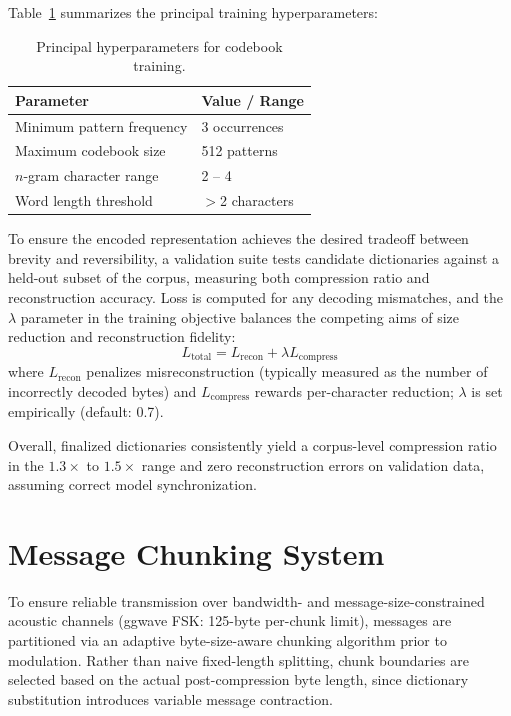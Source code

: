 \documentclass[12pt,openany]{article}
\theoremstyle{definition}
\theoremstyle{definition}
\theoremstyle{definition}
\begin{document}
Table~\ref{tab:training-hyperparameters} summarizes the principal training hyperparameters:

\begin{table}[h]
\centering
\begin{tabular}{|l|l|}
\hline
\textbf{Parameter} & \textbf{Value / Range} \\
\hline
Minimum pattern frequency & 3 occurrences \\
Maximum codebook size & 512 patterns \\
$n$-gram character range & 2 -- 4 \\
Word length threshold & $>$2 characters \\
\hline
\end{tabular}
\caption{Principal hyperparameters for codebook training.}
\label{tab:training-hyperparameters}
\end{table}

To ensure the encoded representation achieves the desired tradeoff between brevity and reversibility, a validation suite tests candidate dictionaries against a held-out subset of the corpus, measuring both compression ratio and reconstruction accuracy. Loss is computed for any decoding mismatches, and the $\lambda$ parameter in the training objective balances the competing aims of size reduction and reconstruction fidelity:
\[
L_{\text{total}} = L_{\text{recon}} + \lambda L_{\text{compress}}
\]
where $L_{\text{recon}}$ penalizes misreconstruction (typically measured as the number of incorrectly decoded bytes) and $L_{\text{compress}}$ rewards per-character reduction; $\lambda$ is set empirically (default: 0.7).

Overall, finalized dictionaries consistently yield a corpus-level compression ratio in the $1.3\times$ to $1.5\times$ range and zero reconstruction errors on validation data, assuming correct model synchronization.

\section*{Message Chunking System}

To ensure reliable transmission over bandwidth- and message-size-constrained acoustic channels (ggwave FSK: 125-byte per-chunk limit), messages are partitioned via an adaptive byte-size-aware chunking algorithm prior to modulation. Rather than naive fixed-length splitting, chunk boundaries are selected based on the actual post-compression byte length, since dictionary substitution introduces variable message contraction.
\end{document}
